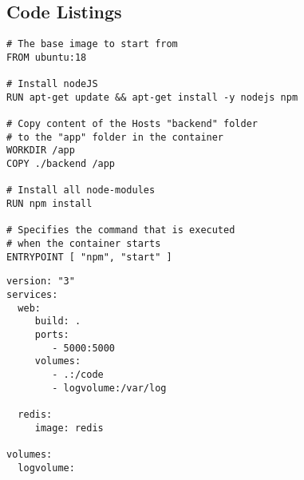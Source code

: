 
\subsection{Code Listings}
\begin{lstlisting}[language=docker, frame=single, caption={Exemplary NodeJS Dockerfile},label=code::docker]
# The base image to start from
FROM ubuntu:18

# Install nodeJS
RUN apt-get update && apt-get install -y nodejs npm

# Copy content of the Hosts "backend" folder
# to the "app" folder in the container
WORKDIR /app
COPY ./backend /app

# Install all node-modules
RUN npm install

# Specifies the command that is executed
# when the container starts
ENTRYPOINT [ "npm", "start" ]

\end{lstlisting}


\begin{lstlisting}[language=docker-compose-2,caption={Example docker-compose.yml},breaklines=true,label={code::compose}]
version: "3"
services:
  web:
     build: .
     ports:
        - 5000:5000
     volumes:
        - .:/code
        - logvolume:/var/log

  redis:
     image: redis

volumes:
  logvolume:
\end{lstlisting}
